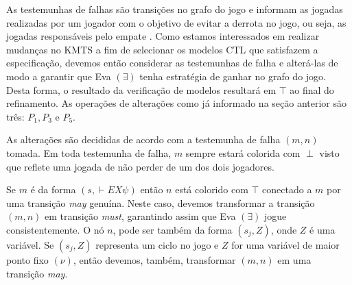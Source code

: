 \documentclass[normaltoc,capchap,capsec,times]{abnt}
\begin{document}
As testemunhas de falhas são transições no grafo do jogo e informam as jogadas realizadas por um jogador com o objetivo de evitar a derrota no jogo, ou seja, as jogadas responsáveis pelo empate \cite{aline}. Como estamos interessados em realizar mudanças no KMTS a fim de selecionar os modelos CTL que satisfazem a especificação, devemos então considerar as testemunhas de falha e alterá-las de modo a garantir que Eva $(\exists)$ tenha estratégia de ganhar no grafo do jogo. Desta forma, o resultado da verificação de modelos resultará em $\top$ ao final do refinamento. As operações de alterações como já informado na seção anterior são três: $P_1, P_3$ e $P_5$.

As alterações são decididas de acordo com a testemunha de falha $(m,n)$ tomada. Em toda testemunha de falha, $m$ sempre estará colorida com $\perp$ visto que reflete uma jogada de não perder de um dos dois jogadores.


Se $m$ é da forma $(s, \vdash EX \psi)$ então $n$ está colorido com $\top$ conectado a $m$ por uma transição \textit{may} genuína. Neste caso, devemos transformar a transição $(m,n)$ em transição \textit{must}, garantindo assim que Eva $(\exists)$ jogue consistentemente. O nó $n$, pode ser também da forma $(s_j, Z)$, onde $Z$  é uma variável. Se $(s_j, Z)$ representa um ciclo no jogo e $Z$ for uma variável de maior ponto fixo $(\nu)$, então devemos, também, transformar $(m,n)$ em uma transição \textit{may}.
\end{document}
